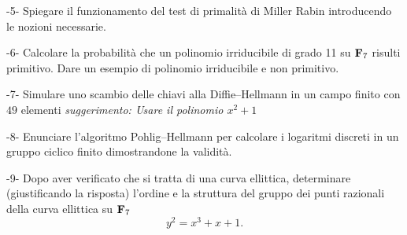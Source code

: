 \item{-5-} Spiegare il funzionamento del test di primalit\`{a} di Miller Rabin introducendo le
nozioni necessarie.

\ve\vs

\item{-6-}  Calcolare la probabilit\`{a} che un polinomio irriducibile di grado 11 su ${\bf F}_{7}$
risulti primitivo. Dare un esempio di polinomio irriducibile e non primitivo.

\vv

\item{-7-}  Simulare uno scambio delle chiavi alla Diffie--Hellmann in un campo finito con
$49$ elementi \hfill {\it suggerimento: Usare il polinomio $x^2+1$}

\ve \vs

\item{-8-} 
Enunciare l'algoritmo Pohlig--Hellmann per calcolare i
logaritmi discreti in un gruppo ciclico finito dimostrandone la validit\`{a}.
\vv

\item{-9-} Dopo aver verificato che si tratta di una curva ellittica, determinare (giustificando la risposta) l'ordine e la struttura del gruppo
dei punti razionali della curva ellittica su ${\bf F}_7$
$$y^2 = x^3 + x + 1.$$
\ \vst

 \bye
